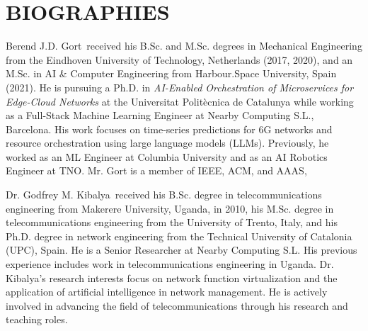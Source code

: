 \documentclass{ieeetmlcn}
\begin{document}
\section*{BIOGRAPHIES}

\begin{IEEEbiography}
{Berend J.D. Gort}~received his B.Sc. and M.Sc. degrees in Mechanical Engineering from the Eindhoven University of Technology, Netherlands (2017, 2020), and an M.Sc. in AI \& Computer Engineering from Harbour.Space University, Spain (2021). He is pursuing a Ph.D. in \textit{AI-Enabled Orchestration of Microservices for Edge-Cloud Networks} at the Universitat Politècnica de Catalunya while working as a Full-Stack Machine Learning Engineer at Nearby Computing S.L., Barcelona. His work focuses on time-series predictions for 6G networks and resource orchestration using large language models (LLMs). Previously, he worked as an ML Engineer at Columbia University and as an AI Robotics Engineer at TNO. Mr. Gort is a member of IEEE, ACM, and AAAS,
\end{IEEEbiography}%

\begin{IEEEbiography}
{Dr. Godfrey M. Kibalya}~received his B.Sc. degree in telecommunications engineering from Makerere University, Uganda, in 2010, his M.Sc. degree in telecommunications engineering from the University of Trento, Italy, and his Ph.D. degree in network engineering from the Technical University of Catalonia (UPC), Spain. He is a Senior Researcher at Nearby Computing S.L. His previous experience includes work in telecommunications engineering in Uganda. Dr. Kibalya's research interests focus on network function virtualization and the application of artificial intelligence in network management. He is actively involved in advancing the field of telecommunications through his research and teaching roles.
\end{IEEEbiography}%
\end{document}
